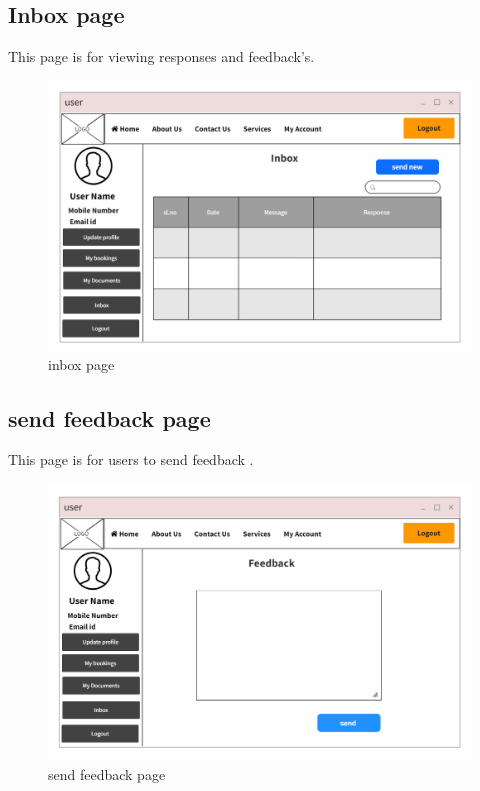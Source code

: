 \documentclass[a4paper,12pt,toc=flat]{report}
\begin{document}
	\pagebreak
	
	
		\subsection{Inbox page}
\hspace*{12pt}
        This page is for viewing  responses and feedback's.
	\begin{figure}[bph]
	\begin{center}
		\includegraphics[width=1.1 \linewidth, height=0.7\textheight]{"user_inbox.png"}
	\end{center}
		\caption{ inbox page}
	\end{figure}

	\pagebreak
	
		\subsection{send feedback page}
\hspace*{12pt}
        This page is for users to send feedback .
	\begin{figure}[bph]
	\begin{center}
		\includegraphics[width=1.1 \linewidth, height=0.7\textheight]{"user_feedback.png"}
	\end{center}
		\caption{ send feedback page}
	\end{figure}
\end{document}
